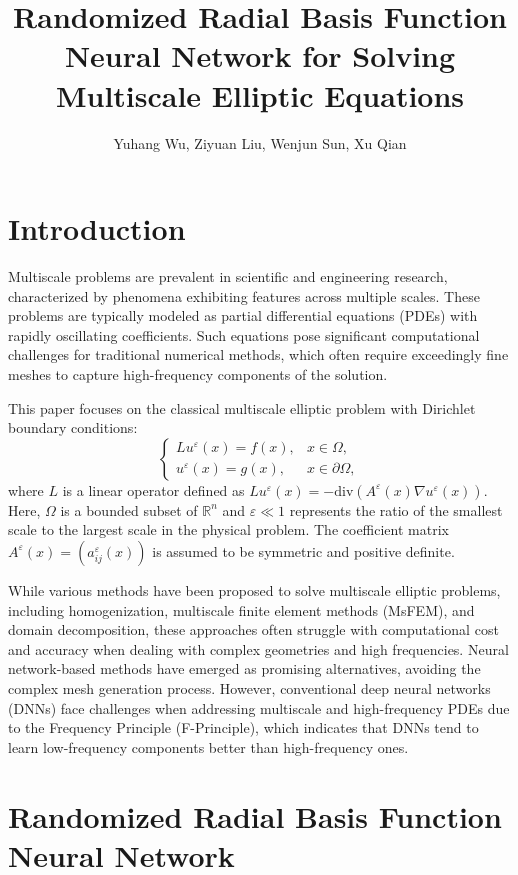 \documentclass[11pt]{article}
\title{Randomized Radial Basis Function Neural Network for Solving Multiscale Elliptic Equations}
\author{Yuhang Wu, Ziyuan Liu, Wenjun Sun, Xu Qian}
\date{}
\begin{document}
\maketitle

\section{Introduction}

Multiscale problems are prevalent in scientific and engineering research, characterized by phenomena exhibiting features across multiple scales. These problems are typically modeled as partial differential equations (PDEs) with rapidly oscillating coefficients. Such equations pose significant computational challenges for traditional numerical methods, which often require exceedingly fine meshes to capture high-frequency components of the solution.

This paper focuses on the classical multiscale elliptic problem with Dirichlet boundary conditions:
\begin{equation}
\begin{cases}
Lu^{\varepsilon}(x) = f(x), & x \in \Omega, \\
u^{\varepsilon}(x) = g(x), & x \in \partial\Omega,
\end{cases}
\end{equation}
where $L$ is a linear operator defined as $Lu^{\varepsilon}(x) = -\text{div}(A^{\varepsilon}(x) \nabla u^{\varepsilon}(x))$. Here, $\Omega$ is a bounded subset of $\mathbb{R}^n$ and $\varepsilon \ll 1$ represents the ratio of the smallest scale to the largest scale in the physical problem. The coefficient matrix $A^{\varepsilon}(x) = (a_{ij}^{\varepsilon}(x))$ is assumed to be symmetric and positive definite.

While various methods have been proposed to solve multiscale elliptic problems, including homogenization, multiscale finite element methods (MsFEM), and domain decomposition, these approaches often struggle with computational cost and accuracy when dealing with complex geometries and high frequencies. Neural network-based methods have emerged as promising alternatives, avoiding the complex mesh generation process. However, conventional deep neural networks (DNNs) face challenges when addressing multiscale and high-frequency PDEs due to the Frequency Principle (F-Principle), which indicates that DNNs tend to learn low-frequency components better than high-frequency ones.

\section{Randomized Radial Basis Function Neural Network}
\end{document}

